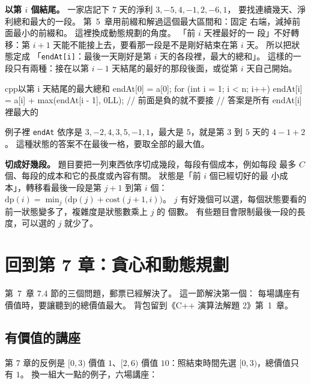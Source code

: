 \textbf{以第 $i$ 個結尾。} 一家店記下 $7$ 天的淨利 $3, -5, 4, -1, 2, -6, 1$，
要找連續幾天、淨利總和最大的一段。 第~5~章用前綴和解過這個最大區間和：固定
右端，減掉前面最小的前綴和。 這裡換成動態規劃的角度。 「前 $i$ 天裡最好的一
段」不好轉移：第
$i + 1$ 天能不能接上去，要看那一段是不是剛好結束在第 $i$ 天。 所以把狀態定成
「\texttt{endAt[i]}：最後一天剛好是第 $i$ 天的各段裡，最大的總和」。 這樣的一
段只有兩種：接在以第 $i - 1$ 天結尾的最好的那段後面，或從第 $i$ 天自己開始。
\begin{code}{cpp}{以第 i 天結尾的最大總和}
endAt[0] = a[0];
for (int i = 1; i < n; i++) {
    endAt[i] = a[i] + max(endAt[i - 1], 0LL);   // 前面是負的就不要接
}
// 答案是所有 endAt[i] 裡最大的
\end{code}
例子裡 \texttt{endAt} 依序是 $3, -2, 4, 3, 5, -1, 1$，最大是 $5$，就是第
$3$ 到 $5$ 天的 $4 - 1 + 2$。 這種狀態的答案不在最後一格，要取全部的最大值。

\textbf{切成好幾段。} 題目要把一列東西依序切成幾段，每段有個成本，例如每段
最多 $C$ 個、每段的成本和它的長度或內容有關。 狀態是「前 $i$ 個已經切好的最
小成本」，轉移看最後一段是第 $j + 1$ 到第 $i$ 個：
$\mathrm{dp}(i) = \min_j \bigl(\mathrm{dp}(j) + \mathrm{cost}(j + 1, i)\bigr)$。
$j$ 有好幾個可以選，每個狀態要看的前一狀態變多了，複雜度是狀態數乘上 $j$ 的
個數。 有些題目會限制最後一段的長度，可以選的 $j$ 就少了。

\section{回到第 7 章：貪心和動態規劃}
\label{sec:dp1-greedy}

第~7~章 7.4 節的三個問題，郵票已經解決了。 這一節解決第一個：
每場講座有價值時，要讓聽到的總價值最大。 背包留到《C++ 演算法解題 2》第~1~章。

\subsection{有價值的講座}

第 7 章的反例是 $[0, 3)$ 價值 $1$、$[2, 6)$ 價值 $10$：照結束時間先選
$[0, 3)$，總價值只有 $1$。 換一組大一點的例子，六場講座：

\begin{center}
\label{fig:valued-talks}
\end{center}

